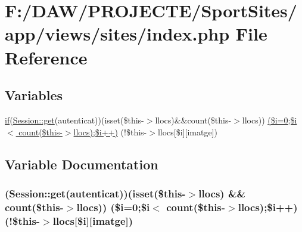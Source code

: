 \hypertarget{app_2views_2sites_2index_8php}{}\section{F\+:/\+D\+A\+W/\+P\+R\+O\+J\+E\+C\+T\+E/\+Sport\+Sites/app/views/sites/index.php File Reference}
\label{app_2views_2sites_2index_8php}
\subsection*{Variables}
\begin{DoxyCompactItemize}
\item 
\hyperlink{app_2views_2index_2index_8php_af71ebd4d252438a1590e85e150ce8954}{if}(\hyperlink{class_session_acf4e501ef0dfb6e98762fbecc9d75b9a}{Session\+::get}(\textquotesingle{}autenticat\textquotesingle{}))(isset(\$this-\/$>$llocs)\&\&count(\$this-\/$>$llocs)) \hyperlink{app_2views_2sites_2index_8php_a48ba74bce45612975fa340b1bb761e7d}{(\$i=0;\$i$<$ count(\$this-\/$>$llocs);\$i++)} (!\$this-\/$>$llocs\mbox{[}\$i\mbox{]}\mbox{[}\textquotesingle{}imatge\textquotesingle{}\mbox{]})
\end{DoxyCompactItemize}


\subsection{Variable Documentation}
\hypertarget{app_2views_2sites_2index_8php_a48ba74bce45612975fa340b1bb761e7d}{}
\subsubsection[{(\$i=0;\$i$<$ count(\$this-\/$>$llocs);\$i++)}]{({\bf Session\+::get}(\textquotesingle{}autenticat\textquotesingle{}))(isset(\$this-\/$>$llocs) \&\& count(\$this-\/$>$llocs)) (\$i=0;\$i$<$ count(\$this-\/$>$llocs);\$i++)(!\$this-\/$>$llocs\mbox{[}\$i\mbox{]}\mbox{[}\textquotesingle{}imatge\textquotesingle{}\mbox{]})}\label{app_2views_2sites_2index_8php_a48ba74bce45612975fa340b1bb761e7d}
